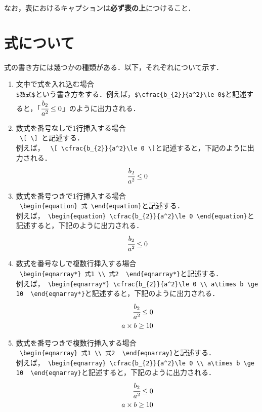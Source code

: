 \documentclass[a4j,titlepage]{jarticle}
\begin{document}
なお，表におけるキャプションは{\bf 必ず表の上}につけること．

\section{式について}

式の書き方には幾つかの種類がある．以下，それぞれについて示す．
\begin{enumerate}
\item 文中で式を入れ込む場合\\
 \verb|$数式$|という書き方をする．例えば，\verb|$\cfrac{b_{2}}{a^2}\le 0$|と記述すると，「$\cfrac{b_{2}}{a^2}\le 0$」のように出力される．
\item 数式を番号なしで1行挿入する場合\\
 \verb| \[ \] |と記述する．\\
例えば，
\verb| \[ \cfrac{b_{2}}{a^2}\le 0 \]|と記述すると，下記のように出力される．
\[ \cfrac{b_{2}}{a^2}\le 0 \]
\item 数式を番号つきで1行挿入する場合\\
\verb| \begin{equation} 式 \end{equation}|と記述する．\\
例えば，\verb| \begin{equation} \cfrac{b_{2}}{a^2}\le 0 \end{equation}|と記述すると，下記のように出力される．
\begin{equation} \cfrac{b_{2}}{a^2}\le 0 \end{equation}
\item 数式を番号なしで複数行挿入する場合\\
\verb| \begin{eqnarray*} 式1 \\ 式2  \end{eqnarray*}|と記述する．\\
例えば，\verb| \begin{eqnarray*} \cfrac{b_{2}}{a^2}\le 0 \\ a\times b \ge 10  \end{eqnarray*}|と記述すると，下記のように出力される．
\begin{eqnarray*} \cfrac{b_{2}}{a^2}\le 0 \\ a\times b \ge 10  \end{eqnarray*}
\item 数式を番号つきで複数行挿入する場合\\
\verb| \begin{eqnarray} 式1 \\ 式2  \end{eqnarray}|と記述する．\\
例えば，\verb| \begin{eqnarray} \cfrac{b_{2}}{a^2}\le 0 \\ a\times b \ge 10  \end{eqnarray}|と記述すると，下記のように出力される．
\begin{eqnarray} \cfrac{b_{2}}{a^2}\le 0 \\ a\times b \ge 10  \end{eqnarray}
\end{enumerate}
\end{document}
